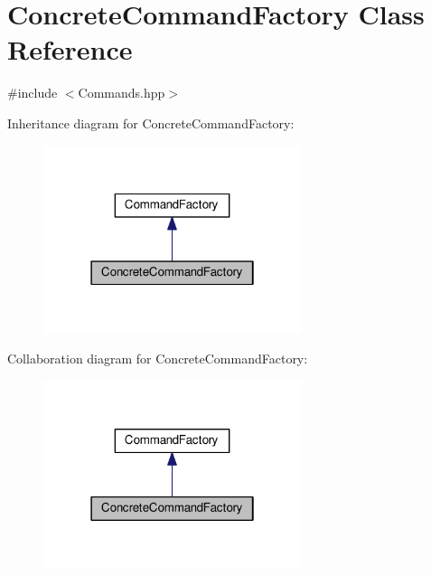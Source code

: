 \hypertarget{classConcreteCommandFactory}{}\section{Concrete\+Command\+Factory Class Reference}
\label{classConcreteCommandFactory}


{\ttfamily \#include $<$Commands.\+hpp$>$}



Inheritance diagram for Concrete\+Command\+Factory\+:\nopagebreak
\begin{figure}[H]
\begin{center}
\leavevmode
\includegraphics[width=214pt]{classConcreteCommandFactory__inherit__graph}
\end{center}
\end{figure}


Collaboration diagram for Concrete\+Command\+Factory\+:
\nopagebreak
\begin{figure}[H]
\begin{center}
\leavevmode
\includegraphics[width=214pt]{classConcreteCommandFactory__coll__graph}
\end{center}
\end{figure}
